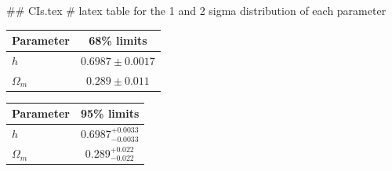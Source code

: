 ## CIs.tex
# latex table for the 1 and 2 sigma distribution of each parameter

\begin{tabular} { l  c}
 Parameter &  68\% limits\\
\hline
{\boldmath$h              $} & $0.6987\pm 0.0017          $\\
{\boldmath$\Omega_m       $} & $0.289\pm 0.011            $\\
\hline
\end{tabular}

\begin{tabular} { l  c}
 Parameter &  95\% limits\\
\hline
{\boldmath$h              $} & $0.6987^{+0.0033}_{-0.0033}$\\
{\boldmath$\Omega_m       $} & $0.289^{+0.022}_{-0.022}   $\\
\hline
\end{tabular}
